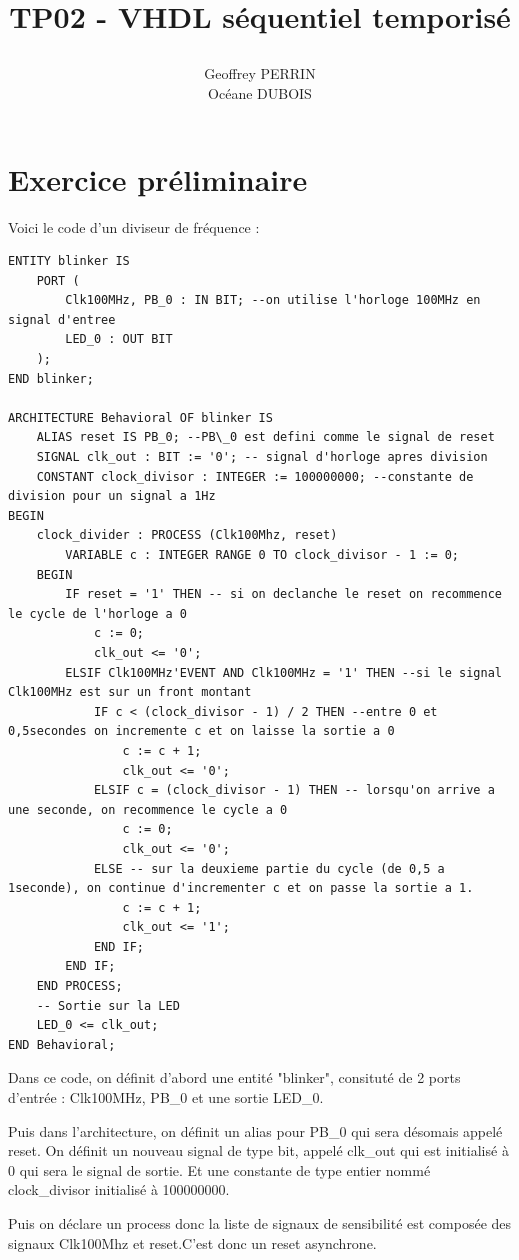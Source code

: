 \documentclass[11pt]{report}
\title{\textbf{TP02 - VHDL séquentiel temporisé}
\author{Geoffrey PERRIN \\ Océane DUBOIS\\}
\date{}}
\begin{document}
\maketitle

\newpage

\section{Exercice préliminaire}

Voici le code d'un diviseur de fréquence  :
\begin{lstlisting}
ENTITY blinker IS
	PORT (
		Clk100MHz, PB_0 : IN BIT; --on utilise l'horloge 100MHz en signal d'entree
		LED_0 : OUT BIT
	);
END blinker;

ARCHITECTURE Behavioral OF blinker IS
	ALIAS reset IS PB_0; --PB\_0 est defini comme le signal de reset
	SIGNAL clk_out : BIT := '0'; -- signal d'horloge apres division
	CONSTANT clock_divisor : INTEGER := 100000000; --constante de division pour un signal a 1Hz
BEGIN
	clock_divider : PROCESS (Clk100Mhz, reset)
		VARIABLE c : INTEGER RANGE 0 TO clock_divisor - 1 := 0;
	BEGIN
		IF reset = '1' THEN -- si on declanche le reset on recommence le cycle de l'horloge a 0
			c := 0;
			clk_out <= '0';
		ELSIF Clk100MHz'EVENT AND Clk100MHz = '1' THEN --si le signal Clk100MHz est sur un front montant
			IF c < (clock_divisor - 1) / 2 THEN --entre 0 et 0,5secondes on incremente c et on laisse la sortie a 0
				c := c + 1;
				clk_out <= '0';
			ELSIF c = (clock_divisor - 1) THEN -- lorsqu'on arrive a une seconde, on recommence le cycle a 0
				c := 0;
				clk_out <= '0';
			ELSE -- sur la deuxieme partie du cycle (de 0,5 a 1seconde), on continue d'incrementer c et on passe la sortie a 1.
				c := c + 1;
				clk_out <= '1';
			END IF;
		END IF;
	END PROCESS;
	-- Sortie sur la LED
	LED_0 <= clk_out;
END Behavioral;
\end{lstlisting}

Dans ce code, on définit d'abord une entité "blinker", consituté de 2 ports d'entrée : Clk100MHz, PB\_0 et une sortie LED\_0.

Puis dans l'architecture, on définit un alias pour PB\_0 qui sera désomais appelé reset. On définit un nouveau signal de type bit, appelé clk\_out qui est initialisé à 0 qui sera le signal de sortie.  Et une constante de type entier nommé clock\_divisor initialisé à 100000000.

Puis on déclare un process donc la liste de signaux de sensibilité est composée des signaux Clk100Mhz et reset.C'est donc un reset asynchrone.
\end{document}
